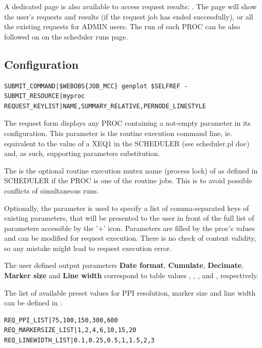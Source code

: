 A dedicated page is also available to access request results: . The page will show the user's requests and results (if the request job has ended successfully), or all the existing requests for ADMIN users. The run of each PROC can be also followed on on the scheduler runs page. 


\subsection{Configuration}

\begin{lstlisting}[title=\wofile{PROC.conf} (excerpt)]
SUBMIT_COMMAND|$WEBOBS{JOB_MCC} genplot $SELFREF -
SUBMIT_RESOURCE|myproc
REQUEST_KEYLIST|NAME,SUMMARY_RELATIVE,PERNODE_LINESTYLE
\end{lstlisting}

The request form displays any PROC containing a not-empty  parameter in its configuration. This parameter is the routine execution command line, ie. equivalent to the value of a XEQ1 in the SCHEDULER (see scheduler.pl doc) and, as such,
supporting  parameters substitution.

The  is the optional routine execution mutex name (process lock) of as defined in SCHEDULER if the PROC is one of the routine jobs. This is to avoid possible conflicts of simultaneous runs.

Optionally, the  parameter is used to specify a list of comma-separated keys of existing parameters, that will be
presented to the user in front of the full list of parameters accessible by the '+' icon. Parameters are filled by the proc's values and can be modified for request execution. There is no check of content validity, so any mistake might lead to request execution error.

The user defined output parameters \textbf{Date format}, \textbf{Cumulate}, \textbf{Decimate}, \textbf{Marker size} and \textbf{Line width} correspond to table values , , ,  and , respectively.

The list of available preset values for PPI resolution, marker size and line width can be defined in  :

\begin{lstlisting}[title=\wofile{WEBOBS.rc} (excerpt)]
REQ_PPI_LIST|75,100,150,300,600
REQ_MARKERSIZE_LIST|1,2,4,6,10,15,20
REQ_LINEWIDTH_LIST|0.1,0.25,0.5,1,1.5,2,3
\end{lstlisting}

